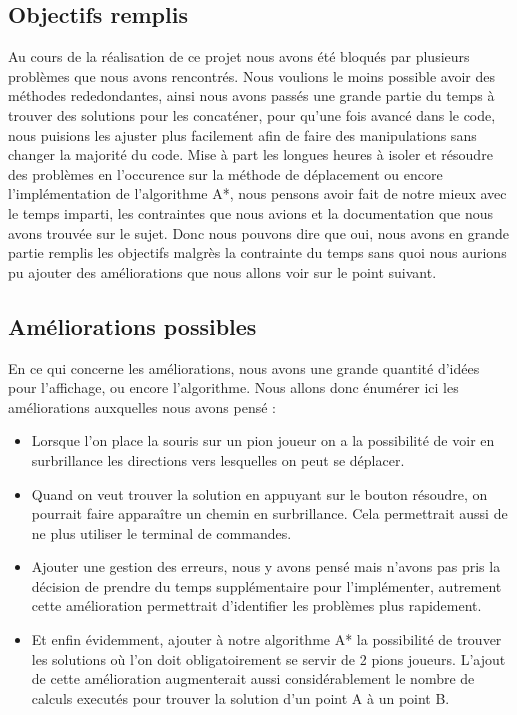 \documentclass{rapportECL}
\begin{document}
\subsection{Objectifs remplis}

Au cours de la réalisation de ce projet nous avons été bloqués par plusieurs problèmes que nous avons rencontrés. Nous voulions le moins possible avoir des méthodes rededondantes, ainsi nous avons passés une grande partie du temps à trouver des solutions pour les concaténer, pour qu'une fois avancé dans le code, nous puisions les ajuster plus facilement afin de faire des manipulations sans changer la majorité du code.
\newline
Mise à part les longues heures à isoler et résoudre des problèmes en l'occurence sur la méthode de déplacement ou encore l'implémentation de l'algorithme A*, nous pensons avoir fait de notre mieux avec le temps imparti, les contraintes que nous avions et la documentation que nous avons trouvée sur le sujet. Donc nous pouvons dire que oui, nous avons en grande partie remplis les objectifs malgrès la contrainte du temps sans quoi nous aurions pu ajouter des améliorations que nous allons voir sur le point suivant.

\subsection{Améliorations possibles}

En ce qui concerne les améliorations, nous avons une grande quantité d'idées pour l'affichage, ou encore l'algorithme. Nous allons donc énumérer ici les améliorations auxquelles nous avons pensé :


\begin{itemize}
    \item Lorsque l'on place la souris sur un pion joueur on a la possibilité de voir en surbrillance les directions vers lesquelles on peut se déplacer.
    \item Quand on veut trouver la solution en appuyant sur le bouton résoudre, on pourrait faire apparaître un chemin en surbrillance. Cela permettrait aussi de ne plus utiliser le terminal de commandes.
    \item Ajouter une gestion des erreurs, nous y avons pensé mais n'avons pas pris la décision de prendre du temps supplémentaire pour l'implémenter, autrement cette amélioration permettrait d'identifier les problèmes plus rapidement. 
    \item Et enfin évidemment, ajouter à notre algorithme A* la possibilité de trouver les solutions où l'on doit obligatoirement se servir de 2 pions joueurs. L'ajout de cette amélioration augmenterait aussi considérablement le nombre de calculs executés pour trouver la solution d'un point A à un point B.
\end{itemize}
\end{document}
